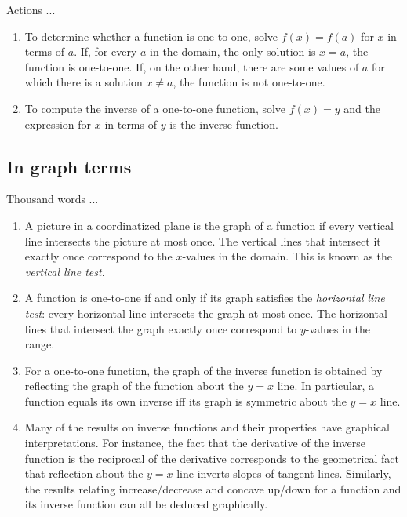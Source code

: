 \documentclass[10pt]{amsart}
\begin{document}
Actions ...

\begin{enumerate}
\item To determine whether a function is one-to-one, solve $f(x) =
  f(a)$ for $x$ in terms of $a$. If, for every $a$ in the domain, the
  only solution is $x = a$, the function is one-to-one. If, on the
  other hand, there are some values of $a$ for which there is a
  solution $x \ne a$, the function is not one-to-one.
\item To compute the inverse of a one-to-one function, solve $f(x) =
  y$ and the expression for $x$ in terms of $y$ is the inverse function.
\end{enumerate}

\subsection{In graph terms}

Thousand words ...

\begin{enumerate}
\item A picture in a coordinatized plane is the graph of a function if
  every vertical line intersects the picture at most once. The
  vertical lines that intersect it exactly once correspond to the
  $x$-values in the domain. This is known as the {\em vertical line
  test}.
\item A function is one-to-one if and only if its graph satisfies the
  {\em horizontal line test}: every horizontal line intersects the
  graph at most once. The horizontal lines that intersect the graph
  exactly once correspond to $y$-values in the range.
\item For a one-to-one function, the graph of the inverse function is
  obtained by reflecting the graph of the function about the $y = x$
  line. In particular, a function equals its own inverse iff its graph
  is symmetric about the $y = x$ line.
\item Many of the results on inverse functions and their properties
  have graphical interpretations. For instance, the fact that the
  derivative of the inverse function is the reciprocal of the
  derivative corresponds to the geometrical fact that reflection about
  the $y = x$ line inverts slopes of tangent lines. Similarly, the
  results relating increase/decrease and concave up/down for a
  function and its inverse function can all be deduced graphically.
\end{enumerate}
\end{document}
